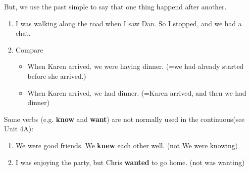 \documentclass[12pt]{article}
\begin{document}
    But, we use the past simple to say that one thing happend after another.
    \begin{enumerate}
        \item I was walking along the road when I saw Dan. So I stopped, and we had a chat.
        \item Compare
        \begin{itemize}
            \item When Karen arrived, we were having dinner. (=we had already started before she arrived.)
            \item When Karen arrived, we had dinner. (=Karen arrived, and then we had dinner)
        \end{itemize}
    \end{enumerate}

    Some verbs (e.g. \textbf{know} and \textbf{want}) are not normally used in the continuous(see Unit 4A):
    \begin{enumerate}
        \item We were good friends. We \textbf{knew} each other well. (not We were knowing)
        \item I was enjoying the party, but Chris \textbf{wanted} to go home. (not was wanting)
    \end{enumerate}
\end{document}

